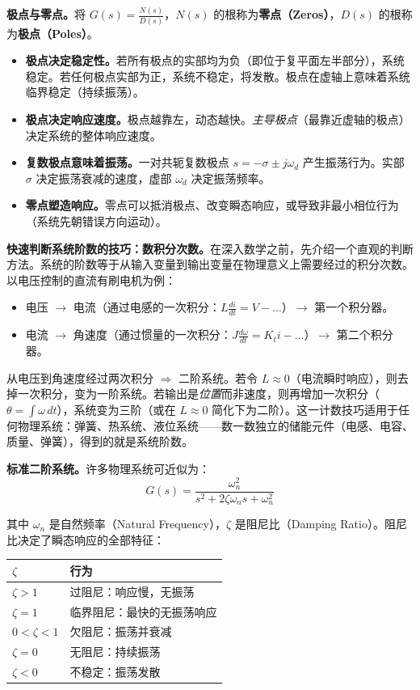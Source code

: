 \textbf{极点与零点。}将 $G(s) = \frac{N(s)}{D(s)}$，$N(s)$ 的根称为\textbf{零点（Zeros）}，$D(s)$ 的根称为\textbf{极点（Poles）}。

\begin{itemize}
    \item \textbf{极点决定稳定性。}若所有极点的实部均为负（即位于复平面左半部分），系统稳定。若任何极点实部为正，系统不稳定，将发散。极点在虚轴上意味着系统临界稳定（持续振荡）。
    \item \textbf{极点决定响应速度。}极点越靠左，动态越快。\textit{主导极点}（最靠近虚轴的极点）决定系统的整体响应速度。
    \item \textbf{复数极点意味着振荡。}一对共轭复数极点 $s = -\sigma \pm j\omega_d$ 产生振荡行为。实部 $\sigma$ 决定振荡衰减的速度，虚部 $\omega_d$ 决定振荡频率。
    \item \textbf{零点塑造响应。}零点可以抵消极点、改变瞬态响应，或导致非最小相位行为（系统先朝错误方向运动）。
\end{itemize}

\textbf{快速判断系统阶数的技巧：数积分次数。}在深入数学之前，先介绍一个直观的判断方法。系统的阶数等于从输入变量到输出变量在物理意义上需要经过的积分次数。以电压控制的直流有刷电机为例：
\begin{itemize}[nosep]
    \item 电压 $\to$ 电流（通过电感的一次积分：$L\frac{di}{dt} = V - \ldots$）$\to$ 第一个积分器。
    \item 电流 $\to$ 角速度（通过惯量的一次积分：$J\frac{d\omega}{dt} = K_t i - \ldots$）$\to$ 第二个积分器。
\end{itemize}
从电压到角速度经过两次积分 $\Rightarrow$ 二阶系统。若令 $L \approx 0$（电流瞬时响应），则去掉一次积分，变为一阶系统。若输出是\textit{位置}而非速度，则再增加一次积分（$\theta = \int \omega\,dt$），系统变为三阶（或在 $L \approx 0$ 简化下为二阶）。这一计数技巧适用于任何物理系统：弹簧、热系统、液位系统——数一数独立的储能元件（电感、电容、质量、弹簧），得到的就是系统阶数。

\textbf{标准二阶系统。}许多物理系统可近似为：
\begin{equation}
G(s) = \frac{\omega_n^2}{s^2 + 2\zeta\omega_n s + \omega_n^2}
\end{equation}

其中 $\omega_n$ 是自然频率（Natural Frequency），$\zeta$ 是阻尼比（Damping Ratio）。阻尼比决定了瞬态响应的全部特征：

\begin{center}
\begin{tabular}{ll}
\toprule
$\zeta$ & \textbf{行为} \\
\midrule
$\zeta > 1$ & 过阻尼：响应慢，无振荡 \\
$\zeta = 1$ & 临界阻尼：最快的无振荡响应 \\
$0 < \zeta < 1$ & 欠阻尼：振荡并衰减 \\
$\zeta = 0$ & 无阻尼：持续振荡 \\
$\zeta < 0$ & 不稳定：振荡发散 \\
\bottomrule
\end{tabular}
\end{center}


